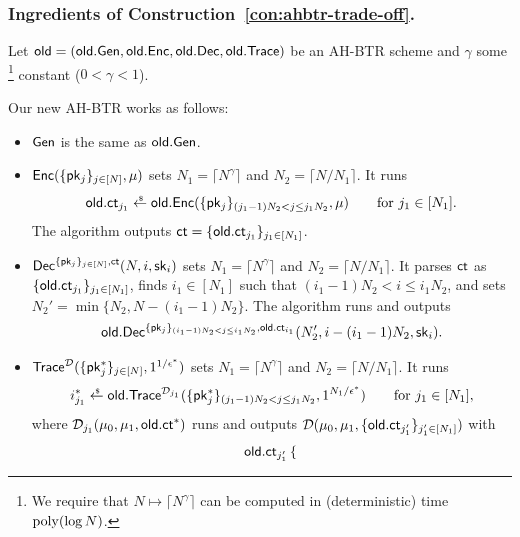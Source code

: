 \subsubsection{Ingredients of Construction~\ref{con:ahbtr-trade-off}.}
Let ${\OLD=(\OLD.\Gen,\OLD.\Enc,\OLD.\Dec,\OLD.\Trace)}$ be an AH-BTR scheme and
$\gamma$ some%
\footnote{We require that ${N\mapsto\lceil N^\gamma\rceil}$ can be computed in (deterministic) time $\operatorname{poly}(\log N)$.}
constant (${0<\gamma<1}$).

\begin{construction}\label{con:ahbtr-trade-off}
Our new AH-BTR works as follows:
\begin{itemize}
\item $\Gen$ is the same as $\OLD.\Gen$.
\item $\Enc(\{\pk_j\}_{j\in[N]},\mu)$ sets
${N_1=\lceil N^\gamma\rceil}$ and
${N_2=\lceil N/N_1\rceil}$.
It runs
\begin{align*}
\OLD.\ct_{j_1}\draws\OLD.\Enc(\{\pk_j\}_{(j_1-1)N_2<j\leq j_1N_2},\mu)
\qquad\textup{for }j_1\in[N_1].
\end{align*}
The algorithm outputs ${\ct=\{\OLD.\ct_{j_1}\}_{j_1\in[N_1]}}$.
\item $\Dec^{\{\pk_j\}_{j\in[N]},\ct}(N,i,\sk_i)$ sets
${N_1=\lceil N^\gamma\rceil}$ and
${N_2=\lceil N/N_1\rceil}$.
It parses $\ct$ as $\{\OLD.\ct_{j_1}\}_{j_1\in[N_1]}$,
finds ${i_1\in[N_1]}$ such that ${(i_1-1)N_2<i\leq i_1N_2}$, and
sets ${N_2'=\min{\{N_2,N-(i_1-1)N_2\}}}$.
The algorithm runs and outputs
\begin{align*}
\OLD.\Dec^{\{\pk_j\}_{(i_1-1)N_2<j\leq i_1N_2},\OLD.\ct_{i_1}}
(N_2',i-(i_1-1)N_2,\sk_i).
\end{align*}
\item $\Trace^\scriptD(\{\pk^\ast_j\}_{j\in[N]},1^{1/\epsilon^\ast})$ sets
${N_1=\lceil N^\gamma\rceil}$ and
${N_2=\lceil N/N_1\rceil}$.
It runs
\begin{align*}
i^\ast_{j_1}\draws\OLD.\Trace^{\scriptD_{j_1}}(\{\pk^\ast_j\}_{(j_1-1)N_2<j\leq j_1N_2},1^{N_1/\epsilon^\ast})
\qquad\textup{for }j_1\in[N_1],
\end{align*}
where
$\scriptD_{j_1}(\mu_0,\mu_1,\OLD.\ct^\ast)$
runs and outputs
$\scriptD(\mu_0,\mu_1,\{\OLD.\ct_{j_1'}\}_{j_1'\in[N_1]})$
with
\begin{align*}
\OLD.\ct_{j_1'}\begin{cases}

\end{cases}
\end{align*}
\end{itemize}
\end{construction}
